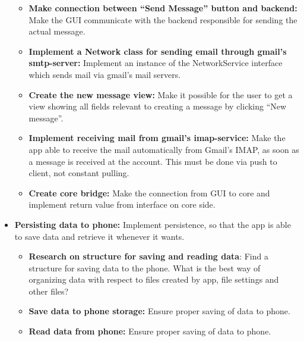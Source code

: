 \begin{itemize}
\begin{itemize}
\item{}\textbf{Make connection between “Send Message” button and backend:} Make the GUI communicate with the backend responsible for sending the actual message.
\item{}\textbf{Implement a Network class for sending email through gmail’s smtp-server:} Implement an instance of the NetworkService interface which sends mail via gmail’s mail servers.
\item{}\textbf{Create the new message view:} Make it possible for the user to get a view showing all fields relevant to creating a message by clicking “New message”.
\item{}\textbf{Implement receiving mail from gmail’s imap-service:} Make the app able to receive the mail automatically from Gmail’s IMAP, as soon as a message is received at the account. This must be done via push to client, not constant pulling.
\item{}\textbf{Create core bridge:} Make the connection from GUI to core and implement return value from interface on core side.
\end{itemize}
\item{}\textbf{Persisting data to phone:} Implement persistence, so that the app is able to save data and retrieve it whenever it wants.
\begin{itemize}
\item{}\textbf{Research on structure for saving and reading data}: Find a structure for saving data to the phone. What is the best way of organizing data with respect to files created by app, file settings and other files?
\item{}\textbf{Save data to phone storage:} Ensure proper saving of data to phone.
\item{}\textbf{Read data from phone:} Ensure proper saving of data to phone.
\end{itemize}
\end{itemize}